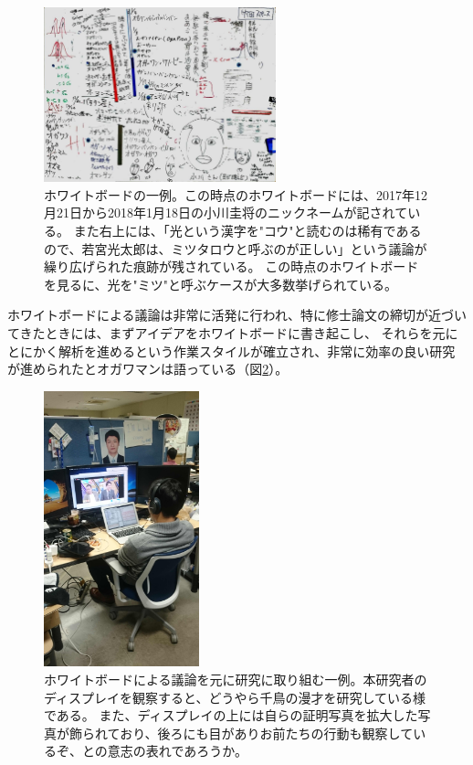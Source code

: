 \begin{figure}
  \begin{center}
  \includegraphics[width=0.6\textwidth]{./section/Mimi/figures/WhiteBoard.jpg}
  \caption{ホワイトボードの一例。この時点のホワイトボードには、2017年12月21日から2018年1月18日の小川圭将のニックネームが記されている。
    また右上には、「光という漢字を"コウ"と読むのは稀有であるので、若宮光太郎は、ミツタロウと呼ぶのが正しい」という議論が繰り広げられた痕跡が残されている。
    この時点のホワイトボードを見るに、光を"ミツ"と呼ぶケースが大多数挙げられている。}
  \label{fig;WhiteBoard}
  \end{center}
\end{figure}

ホワイトボードによる議論は非常に活発に行われ、特に修士論文の締切が近づいてきたときには、まずアイデアをホワイトボードに書き起こし、
それらを元にとにかく解析を進めるという作業スタイルが確立され、非常に効率の良い研究が進められたとオガワマンは語っている（図\ref{fig:OgawaChidori}）。

\begin{figure}
  \begin{center}
  \includegraphics[width=0.4\textwidth]{./section/Mimi/figures/OgawaChidori.jpg}
  \caption{ホワイトボードによる議論を元に研究に取り組む一例。本研究者のディスプレイを観察すると、どうやら千鳥の漫才を研究している様である。
    また、ディスプレイの上には自らの証明写真を拡大した写真が飾られており、後ろにも目がありお前たちの行動も観察しているぞ、との意志の表れであろうか。}
  \label{fig:OgawaChidori}
  \end{center}
\end{figure}

